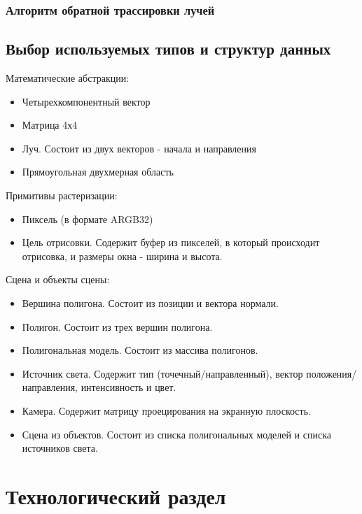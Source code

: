 \subsection{Алгоритм обратной трассировки лучей}

\section{Выбор используемых типов и структур данных}

Математические абстракции:

\begin{itemize}
	\item Четырехкомпонентный вектор
	\item Матрица 4х4
	\item Луч. Состоит из двух векторов - начала и направления
	\item Прямоугольная двухмерная область
\end{itemize}

Примитивы растеризации:

\begin{itemize}
	\item Пиксель (в формате ARGB32)
	\item Цель отрисовки. Содержит буфер из пикселей, в который происходит отрисовка, и размеры окна - ширина и высота.
\end{itemize}

Сцена и объекты сцены:

\begin{itemize}
	\item Вершина полигона. Состоит из позиции и вектора нормали.
	\item Полигон. Состоит из трех вершин полигона.
	\item Полигональная модель. Состоит из массива полигонов.
	\item Источник света. Содержит тип (точечный/направленный), вектор положения/направления, интенсивность и цвет.
	\item Камера. Содержит матрицу проецирования на экранную плоскость.
	\item Сцена из объектов. Состоит из списка полигональных моделей и списка источников света.
\end{itemize}

\chapter{Технологический раздел}

